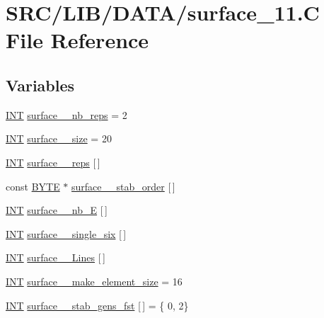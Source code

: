 \hypertarget{surface__11_8_c}{}\section{S\+R\+C/\+L\+I\+B/\+D\+A\+T\+A/surface\+\_\+11.C File Reference}
\label{surface__11_8_c}
\subsection*{Variables}
\begin{DoxyCompactItemize}
\item 
\mbox{\hyperlink{galois_8h_a09fddde158a3a20bd2dcadb609de11dc}{I\+NT}} \mbox{\hyperlink{surface__11_8_c_a85e94f2bf712f3b90e517ff61e5d378d}{surface\+\_\+\_\+nb\+\_\+reps}} = 2
\item 
\mbox{\hyperlink{galois_8h_a09fddde158a3a20bd2dcadb609de11dc}{I\+NT}} \mbox{\hyperlink{surface__11_8_c_a1618a07f3eeb952f764e8bf87b1d2c2a}{surface\+\_\+\_\+size}} = 20
\item 
\mbox{\hyperlink{galois_8h_a09fddde158a3a20bd2dcadb609de11dc}{I\+NT}} \mbox{\hyperlink{surface__11_8_c_a8eb526f98cca51ab804b805e7fd50003}{surface\+\_\+\_\+reps}} \mbox{[}$\,$\mbox{]}
\item 
const \mbox{\hyperlink{galois_8h_ab6cc7b4aeb6ea31aba2b3fbfc83ff5e6}{B\+Y\+TE}} $\ast$ \mbox{\hyperlink{surface__11_8_c_ac46b8199fcb2f000816a4177b135abbd}{surface\+\_\+\_\+stab\+\_\+order}} \mbox{[}$\,$\mbox{]}
\item 
\mbox{\hyperlink{galois_8h_a09fddde158a3a20bd2dcadb609de11dc}{I\+NT}} \mbox{\hyperlink{surface__11_8_c_aa289fc051693f30d91280431372f8a67}{surface\+\_\+\_\+nb\+\_\+E}} \mbox{[}$\,$\mbox{]}
\item 
\mbox{\hyperlink{galois_8h_a09fddde158a3a20bd2dcadb609de11dc}{I\+NT}} \mbox{\hyperlink{surface__11_8_c_a46dc300048802bcff4e0bbfc942d49de}{surface\+\_\+\_\+single\+\_\+six}} \mbox{[}$\,$\mbox{]}
\item 
\mbox{\hyperlink{galois_8h_a09fddde158a3a20bd2dcadb609de11dc}{I\+NT}} \mbox{\hyperlink{surface__11_8_c_ae63188ef22dd753789e5a20a0b9cb8f6}{surface\+\_\+\_\+\+Lines}} \mbox{[}$\,$\mbox{]}
\item 
\mbox{\hyperlink{galois_8h_a09fddde158a3a20bd2dcadb609de11dc}{I\+NT}} \mbox{\hyperlink{surface__11_8_c_a0cecdcef2079d6dccd264005894930e7}{surface\+\_\+\_\+make\+\_\+element\+\_\+size}} = 16
\item 
\mbox{\hyperlink{galois_8h_a09fddde158a3a20bd2dcadb609de11dc}{I\+NT}} \mbox{\hyperlink{surface__11_8_c_a360ac4f6cfe43081d1fc034857aa194f}{surface\+\_\+\_\+stab\+\_\+gens\+\_\+fst}} \mbox{[}$\,$\mbox{]} = \{ 0, 2\}

\end{DoxyCompactItemize}
